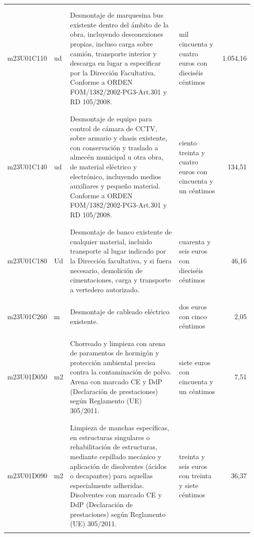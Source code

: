 \begin{supertabular}{|l|l|p{5cm}|p{3cm}|r|}
&&&&\\%
&&&&\\%
m23U01C110&ud&Desmontaje de marquesina bus existente dentro del ámbito de la obra, incluyendo desconexiones propias, incluso carga sobre camión, transporte interior y descarga en lugar a especificar por la Dirección Facultativa. Conforme a ORDEN FOM/1382/2002{-}PG3{-}Art.301 y RD 105/2008.&mil cincuenta y cuatro euros con dieciséis céntimos&1.054,16\\%
&&&&\\%
&&&&\\%
m23U01C140&ud&Desmontaje de equipo para control de cámara de CCTV, sobre armario y chasis existente, con conservación y traslado a almecén municipal u otra obra, de material eléctrico y electrónico, incluyendo medios auxiliares y pequeño material. Conforme a ORDEN FOM/1382/2002{-}PG3{-}Art.301 y RD 105/2008.&ciento treinta y cuatro euros con cincuenta y un céntimos&134,51\\%
&&&&\\%
&&&&\\%
m23U01C180&Ud&Desmontaje de banco existente de cualquier material, incluido transporte al lugar indicado por la Dirección facultativa, y si fuera necesario, demolición de cimentaciones, carga y transporte a vertedero autorizado.&cuarenta y seis euros con dieciséis céntimos&46,16\\%
&&&&\\%
&&&&\\%
m23U01C260&m&Desmontaje de cableado eléctrico existente.&dos euros con cinco céntimos&2,05\\%
&&&&\\%
&&&&\\%
m23U01D050&m2&Chorreado y limpieza con arena de paramentos de hormigón y protección ambiental precisa contra la contaminación de polvo. Arena con marcado CE y DdP (Declaración de prestaciones) según Reglamento (UE) 305/2011.&siete euros con cincuenta y un céntimos&7,51\\%
&&&&\\%
&&&&\\%
m23U01D090&m2&Limpieza de manchas específicas, en estructuras singulares o rehabilitación de estructuras, mediante cepillado mecánico y aplicación de disolventes (ácidos o decapantes) para aquellas especialmente adheridas. Disolventes con marcado CE y DdP (Declaración de prestaciones) según Reglamento (UE) 305/2011.&treinta y seis euros con treinta y siete céntimos&36,37\\%
&&&&\\%

\end{supertabular}
